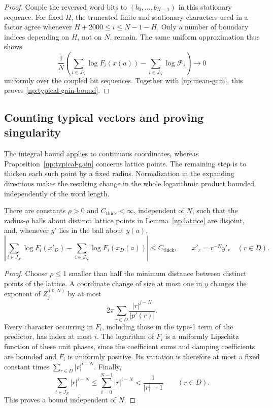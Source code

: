 \begin{proof}
Couple the reversed word bits to \((b_0,\ldots,b_{N-1})\) in this
stationary sequence. For fixed \(H\), the truncated finite and
stationary characters used in a factor agree whenever
\(H+2000\le i\le N-1-H\). Only a number of boundary indices depending
on \(H\), not on \(N\), remain. The same uniform approximation thus
shows
\[
 \frac1N\left(
   \sum_{i\in J_N}\log F_i(x(a))
       -\sum_{i\in J_N}\log\mathcal F_i\right)\longrightarrow0
\]
uniformly over the coupled bit sequences. Together with
\eqref{np:mean-gain}, this proves \eqref{np:typical-gain-bound}.
\end{proof}

\subsection{Counting typical vectors and proving singularity}
\label{np:cover-section}

The integral bound applies to continuous coordinates, whereas
Proposition~\ref{np:typical-gain} concerns lattice points. The remaining
step is to thicken each such point by a fixed radius. Normalization in
the expanding directions makes the resulting change in the whole
logarithmic product bounded independently of the word length.

\begin{lemma}\label{np:thickening}
There are constants \(\rho>0\) and \(C_{\mathrm{thick}}<\infty\), independent of
\(N\), such that the radius-\(\rho\) balls about distinct lattice points
in Lemma~\ref{np:lattice} are disjoint, and, whenever \(y'\) lies in the
ball about \(y(a)\),
\begin{equation}
 \left|\sum_{i\in J_N}\log F_i(x'_D)
       -\sum_{i\in J_N}\log F_i(x_D(a))\right|\le C_{\mathrm{thick}},
 \qquad x'_r=r^{-N}y'_r\quad(r\in D).
 \label{np:thickening-bound}
\end{equation}
\end{lemma}

\begin{proof}
Choose \(\rho\le1\) smaller than half the minimum distance between
distinct points of the lattice. A coordinate change of size at most
one in \(y\) changes the exponent of \(Z_j^{(0,N)}\) by at most
\[
 2\pi\sum_{r\in D}\frac{|r|^{j-N}}{|p'(r)|}.
\]
Every character occurring in \(F_i\), including those in the type-1
term of the predictor, has index at most \(i\). The logarithm of
\(F_i\) is a uniformly Lipschitz function of these unit phases, since
the coefficient sums and damping coefficients are bounded and \(F_i\)
is uniformly positive. Its variation is therefore at most a fixed
constant times \(\sum_{r\in D}|r|^{i-N}\). Finally,
\[
 \sum_{i\in J_N}|r|^{i-N}
 \le\sum_{i=0}^{N-1}|r|^{i-N}
 <\frac1{|r|-1}\qquad(r\in D).
\]
This proves a bound independent of \(N\).
\end{proof}

